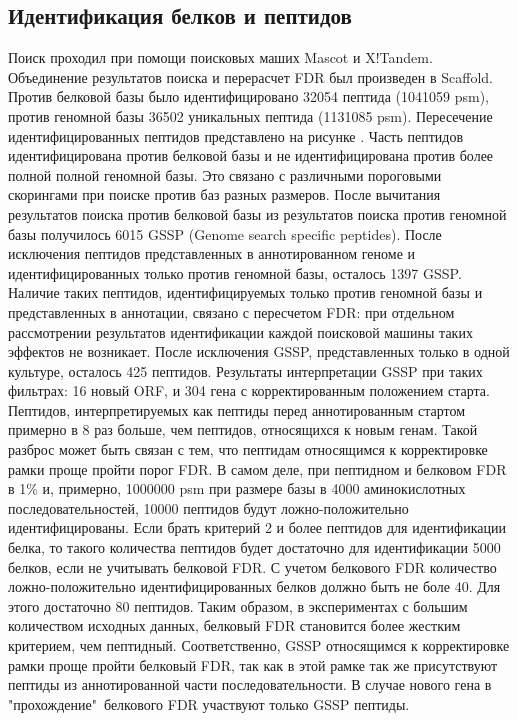 \subsection{Идентификация белков и пептидов}
Поиск проходил при помощи поисковых маших Mascot и X!Tandem. Объединение результатов поиска и перерасчет FDR был произведен в Scaffold. Против белковой базы было идентифицировано 32054 пептида (1041059 psm), против геномной базы 36502 уникальных пептида (1131085 psm). Пересечение идентифицированных пептидов представлено на рисунке . Часть пептидов идентифицирована против белковой базы и не идентифицирована против более полной полной геномной базы. Это связано с различными пороговыми скорингами при поиске против баз разных размеров. 
После вычитания результатов поиска против белковой базы из результатов поиска против геномной базы получилось 6015 GSSP (Genome search specific peptides).  После исключения пептидов представленных в аннотированном геноме и идентифицированных только против геномной базы, осталось 1397 GSSP. Наличие таких пептидов, идентифицируемых только против геномной базы и представленных в аннотации, связано с пересчетом FDR: при отдельном рассмотрении результатов идентификации каждой поисковой машины таких эффектов не возникает.  После исключения GSSP, представленных только в одной культуре, осталось 425 пептидов. Результаты интерпретации GSSP при таких фильтрах: 16 новый ORF, и 304 гена с корректированным положением старта.  
Пептидов, интерпретируемых как пептиды перед аннотированным стартом примерно в 8 раз больше, чем пептидов, относящихся к новым генам. Такой разброс может быть связан с тем, что пептидам относящимся к корректировке рамки проще пройти порог FDR. В самом деле, при пептидном и белковом FDR в 1\% и, примерно, 1000000 psm при размере базы в 4000 аминокислотных последовательностей, 10000 пептидов будут ложно-положительно идентифицированы. Если брать критерий 2 и более пептидов для идентификации белка, то такого количества пептидов будет достаточно для идентификации 5000 белков, если не учитывать белковой FDR. С учетом белкового FDR количество ложно-положительно идентифицированных белков должно быть не боле 40. Для этого достаточно 80 пептидов. Таким образом, в экспериментах с большим количеством исходных данных, белковый FDR становится более жестким критерием, чем пептидный. Соответственно, GSSP относящимся к корректировке рамки проще пройти белковый FDR, так как в этой рамке так же присутствуют пептиды из аннотированной части последовательности. В случае нового гена в "прохождение"\ белкового FDR участвуют только GSSP пептиды.

